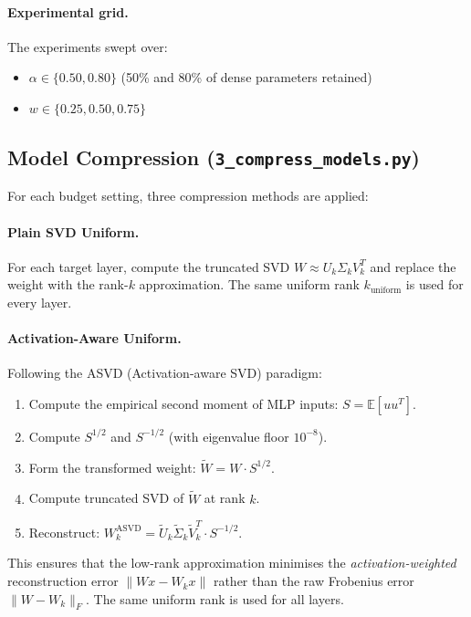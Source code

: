 \documentclass[11pt]{article}
\begin{document}
\paragraph{Experimental grid.}
The experiments swept over:
\begin{itemize}
    \item $\alpha \in \{0.50, 0.80\}$ (50\% and 80\% of dense parameters retained)
    \item $w \in \{0.25, 0.50, 0.75\}$
\end{itemize}

\subsection{Model Compression (\texttt{3\_compress\_models.py})}

For each budget setting, three compression methods are applied:

\paragraph{Plain SVD Uniform.}
For each target layer, compute the truncated SVD $W \approx U_k \Sigma_k V_k^T$ and replace the weight with the rank-$k$ approximation.  The same uniform rank $k_{\text{uniform}}$ is used for every layer.

\paragraph{Activation-Aware Uniform.}
Following the ASVD (Activation-aware SVD) paradigm:
\begin{enumerate}
    \item Compute the empirical second moment of MLP inputs: $S = \mathbb{E}[uu^T]$.
    \item Compute $S^{1/2}$ and $S^{-1/2}$ (with eigenvalue floor $10^{-8}$).
    \item Form the transformed weight: $\widetilde{W} = W \cdot S^{1/2}$.
    \item Compute truncated SVD of $\widetilde{W}$ at rank $k$.
    \item Reconstruct: $W_k^{\text{ASVD}} = \widetilde{U}_k \widetilde{\Sigma}_k \widetilde{V}_k^T \cdot S^{-1/2}$.
\end{enumerate}
This ensures that the low-rank approximation minimises the \emph{activation-weighted} reconstruction error $\|Wx - W_k x\|$ rather than the raw Frobenius error $\|W - W_k\|_F$.  The same uniform rank is used for all layers.
\end{document}
